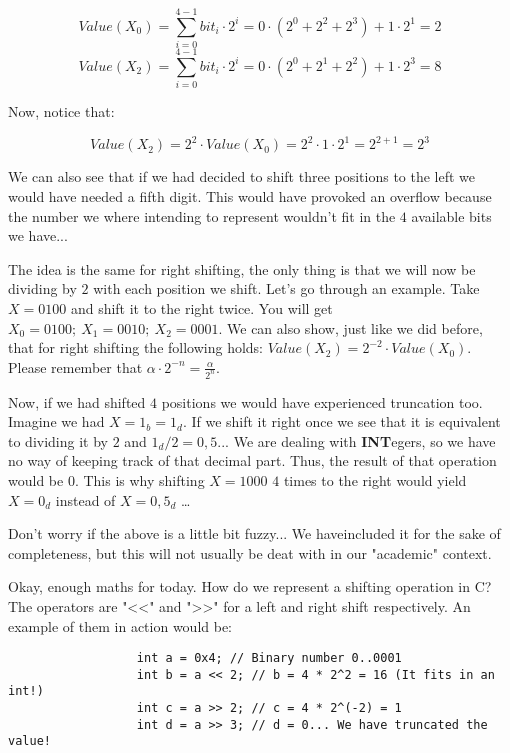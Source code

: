 \documentclass[12pt]{book}
\begin{document}
                $$Value(X_0) = \sum_{i = 0}^{4 - 1} bit_i \cdot 2^{i} = 0 \cdot (2^{0} + 2^{2} + 2^{3}) + 1 \cdot 2^{1} = 2$$
                $$Value(X_2) = \sum_{i = 0}^{4 - 1} bit_i \cdot 2^{i} = 0 \cdot (2^{0} + 2^{1} + 2^{2}) + 1 \cdot 2^{3} = 8$$

                Now, notice that:

                $$Value(X_2) = 2^{2} \cdot Value(X_0) = 2^{2} \cdot 1 \cdot 2^{1} = 2^{2 + 1} = 2^3$$

                We can also see that if we had decided to shift three positions to the left we would have needed a fifth digit. This would have provoked an overflow because the number we where intending to represent wouldn't fit in the $4$ available bits we have...

                The idea is the same for right shifting, the only thing is that we will now be dividing by $2$ with each position we shift. Let's go through an example. Take $X = 0100$ and shift it to the right twice. You will get $X_0 = 0100;\ X_1 = 0010;\ X_2 = 0001$. We can also show, just like we did before, that for right shifting the following holds: $Value(X_2) = 2^{-2} \cdot Value(X_0)$. Please remember that $\alpha \cdot 2^{-n} = \frac{\alpha}{2^n}$.

                Now, if we had shifted $4$ positions we would have experienced truncation too. Imagine we had $X = 1_b = 1_d$. If we shift it right once we see that it is equivalent to dividing it by $2$ and $1_d / 2 = 0,5$... We are dealing with \textbf{INT}egers, so we have no way of keeping track of that decimal part. Thus, the result of that operation would be $0$. This is why shifting $X = 1000$ $4$ times to the right would yield $X = 0_d$ instead of $X = 0,5_d$ \dots

                Don't worry if the above is a little bit fuzzy... We haveincluded it for the sake of completeness, but this will not usually be deat with in our "academic" context.

                Okay, enough maths for today. How do we represent a shifting operation in C? The operators are "<<" and ">>" for a left and right shift respectively. An example of them in action would be:

                \begin{verbatim}
                  int a = 0x4; // Binary number 0..0001
                  int b = a << 2; // b = 4 * 2^2 = 16 (It fits in an int!)
                  int c = a >> 2; // c = 4 * 2^(-2) = 1
                  int d = a >> 3; // d = 0... We have truncated the value!
                \end{verbatim}
\end{document}
